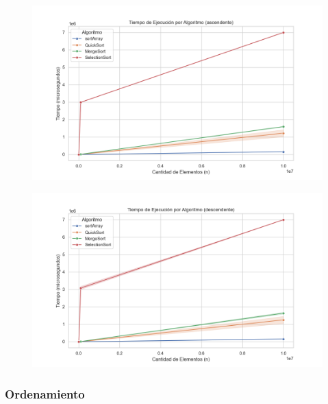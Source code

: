 \begin{figure}[H]
    \centering
    \begin{minipage}[t]{1\textwidth}
        \includegraphics[width=\textwidth]{../code/sorting/data/plots/tiempo_vs_algoritmo_ascendente.png}
     \end{minipage}%
    \caption{}
    \label{fig:scatterplot_3}
\end{figure}

\begin{figure}[H]
    \centering
    \begin{minipage}[t]{1\textwidth}
        \includegraphics[width=\textwidth]{../code/sorting/data/plots/tiempo_vs_algoritmo_descendente.png}
     \end{minipage}%
    \caption{}
    \label{fig:scatterplot_3}
\end{figure}

\subsubsection{Ordenamiento}

